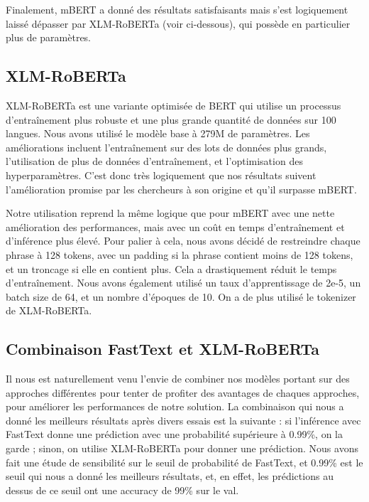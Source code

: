 Finalement, mBERT a donné des résultats satisfaisants mais s'est logiquement laissé dépasser par XLM-RoBERTa (voir ci-dessous), qui possède en particulier plus de paramètres.

\subsection{XLM-RoBERTa}

XLM-RoBERTa \cite{conneau2020unsupervised} est une variante optimisée de BERT \cite{devlin2019bert} qui utilise un processus d'entraînement plus robuste et une plus grande quantité de données sur 100 langues. Nous avons utilisé le modèle base à 279M de paramètres. Les améliorations incluent l'entraînement sur des lots de données plus grands, l'utilisation de plus de données d'entraînement, et l'optimisation des hyperparamètres. C'est donc très logiquement que nos résultats suivent l'amélioration promise par les chercheurs à son origine et qu'il surpasse mBERT.

Notre utilisation reprend la même logique que pour mBERT avec une nette amélioration des performances, mais avec un coût en temps d'entraînement et d'inférence plus élevé. Pour palier à cela, nous avons décidé de restreindre chaque phrase à 128 tokens, avec un padding si la phrase contient moins de 128 tokens, et un troncage si elle en contient plus. Cela a drastiquement réduit le temps d'entraînement. Nous avons également utilisé un taux d'apprentissage de 2e-5, un batch size de 64, et un nombre d'époques de 10. On a de plus utilisé le tokenizer de XLM-RoBERTa.

\subsection{Combinaison FastText et XLM-RoBERTa}

Il nous est naturellement venu l'envie de combiner nos modèles portant sur des approches différentes pour tenter de profiter des avantages de chaques approches, pour améliorer les performances de notre solution. La combinaison qui nous a donné les meilleurs résultats après divers essais est la suivante : si l'inférence avec FastText donne une prédiction avec une probabilité supérieure à 0.99\%, on la garde ; sinon, on utilise XLM-RoBERTa pour donner une prédiction. Nous avons fait une étude de sensibilité sur le seuil de probabilité de FastText, et 0.99\% est le seuil qui nous a donné les meilleurs résultats, et, en effet, les prédictions au dessus de ce seuil ont une accuracy de 99\% sur le val.